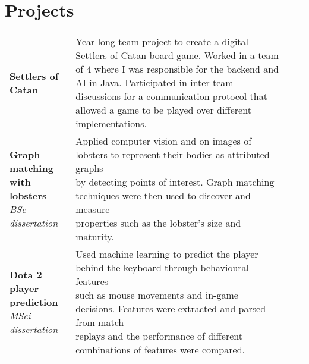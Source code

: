 \documentclass{article}
\newcommand{\n}[0]{\\[\baselineskip]}
\begin{document}
\section*{Projects}

\renewcommand{\arraystretch}{1.3}
\begin{tabular}{p{4.2cm}|p{15cm}}
\textbf{Settlers of Catan} & Year long team project to create a digital Settlers of Catan board game. Worked in a team of 4 where I was responsible for the backend and AI in Java. Participated in inter-team discussions for a communication protocol that allowed a game to be played over different implementations. \n




\makecell[tl]{\textbf{Graph matching with} \\ \textbf{lobsters} \\ \textit{BSc dissertation}} & \makecell[tl]{Applied computer vision and on images of lobsters to represent their bodies as attributed graphs \\ by detecting points of interest. Graph matching techniques were then used to discover and measure \\ properties such as the lobster's size and maturity.} \n

\makecell[tl]{\textbf{Dota 2 player prediction} \\ \textit{MSci dissertation}} & \makecell[tl]{Used machine learning to predict the player behind the keyboard through behavioural features \\ such as mouse movements and in-game decisions. Features were extracted and parsed from match \\ replays and the performance of different combinations of features were compared.}
\end{tabular}
\end{document}

